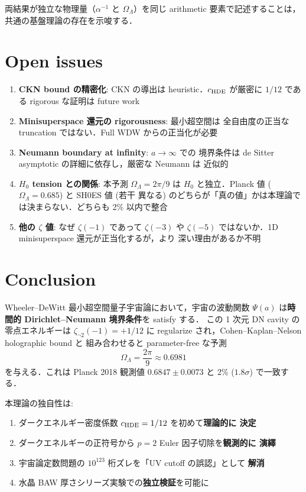 \documentclass[11pt,a4paper]{article}
\begin{document}
両結果が独立な物理量（$\alpha^{-1}$ と $\Omega_\Lambda$）を同じ
arithmetic 要素で記述することは，共通の基盤理論の存在を示唆する．

\section{Open issues}

\begin{enumerate}
\item \textbf{CKN bound の精密化}: CKN の導出は heuristic．$c_{\rm HDE}$
が厳密に $1/12$ である rigorous な証明は future work
\item \textbf{Minisuperspace 還元の rigorousness}: 最小超空間は
全自由度の正当な truncation ではない．Full WDW からの正当化が必要
\item \textbf{Neumann boundary at infinity}: $a \to \infty$ での
境界条件は de Sitter asymptotic の詳細に依存し，厳密な Neumann は
近似的
\item \textbf{$H_0$ tension との関係}: 本予測 $\Omega_\Lambda = 2\pi/9$ は
$H_0$ と独立．Planck 値 ($\Omega_\Lambda = 0.685$) と SH0ES 値 (若干
異なる) のどちらが「真の値」かは本理論では決まらない．どちらも 2\%
以内で整合
\item \textbf{他の $\zeta$ 値}: なぜ $\zeta(-1)$ であって $\zeta(-3)$ や
$\zeta(-5)$ ではないか．1D minisuperspace 還元が正当化するが，より
深い理由があるか不明
\end{enumerate}

\section{Conclusion}

Wheeler--DeWitt 最小超空間量子宇宙論において，宇宙の波動関数
$\Psi(a)$ は\textbf{時間的 Dirichlet--Neumann 境界条件}を satisfy する．
この 1 次元 DN cavity の零点エネルギーは $\zeta_{\neg 2}(-1) = +1/12$ に
regularize され，Cohen--Kaplan--Nelson holographic bound と
組み合わせると parameter-free な予測
\begin{equation}
\Omega_\Lambda = \frac{2\pi}{9} \approx 0.6981
\end{equation}
を与える．これは Planck 2018 観測値 $0.6847 \pm 0.0073$ と 2\%
($1.8\sigma$) で一致する．

本理論の独自性は:
\begin{enumerate}
\item ダークエネルギー密度係数 $c_{\rm HDE} = 1/12$ を初めて\textbf{理論的に
決定}
\item ダークエネルギーの正符号から $p=2$ Euler 因子切除を\textbf{観測的に
演繹}
\item 宇宙論定数問題の $10^{123}$ 桁ズレを「UV cutoff の誤認」として
\textbf{解消}
\item 水晶 BAW 厚さシリーズ実験での\textbf{独立検証}を可能に
\end{enumerate}
\end{document}
